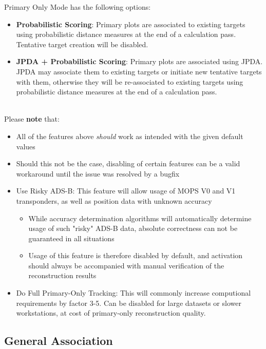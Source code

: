 Primary Only Mode has the following options:
\begin{itemize}
    \item \textbf{Probabilistic Scoring}: Primary plots are associated to existing targets using probabilistic distance measures at the end of a calculation pass. Tentative target creation will be disabled.
    \item \textbf{JPDA + Probabilistic Scoring}: Primary plots are associated using JPDA. JPDA may associate them to existing targets or initiate new tentative targets with them, otherwise they will be re-associated to existing targets using probabilistic distance measures at the end of a calculation pass.
\end{itemize}
\ \\

Please \textbf{note} that:
\begin{itemize}
\item All of the features above \textit{should} work as intended with the given default values
\item Should this not be the case, disabling of certain features can be a valid workaround until the issue was resolved by a bugfix
\item Use Risky ADS-B: This feature will allow usage of MOPS V0 and V1 transponders, as well as position data with unknown accuracy
\begin{itemize}
\item While accuracy determination algorithms will automatically determine usage of such "risky" ADS-B data, absolute correctness can not be guaranteed in all situations
\item Usage of this feature is therefore disabled by default, and activation should always be accompanied with manual verification of the reconstruction results
\end{itemize}
\item Do Full Primary-Only Tracking: This will commonly increase computional requirements by factor 3-5. Can be disabled for large datasets or slower workstations, at cost of primary-only reconstruction quality.
\end{itemize}

\bigskip


\subsection{General Association} 


